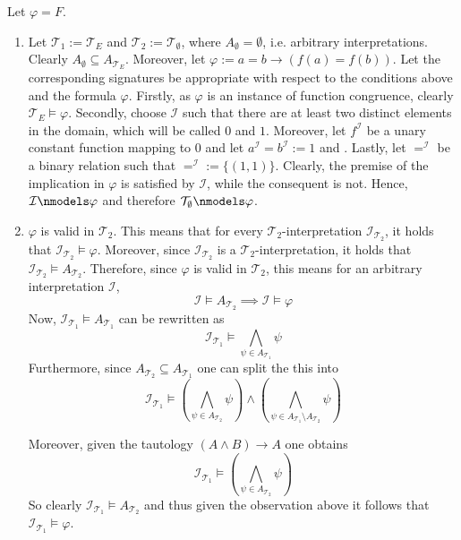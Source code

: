 \documentclass[11pt,a4paper]{article}
\begin{document}
Let $\varphi=F$. 
\begin{enumerate}
\item Let $\mathcal{T}_1 := \mathcal{T}_E$ and $\mathcal{T}_2:= \mathcal{T}_{\emptyset}$, where $A_{\emptyset}= \emptyset$, i.e. arbitrary interpretations. Clearly $A_{\emptyset}\subseteq A_{\mathcal{T}_E}$. Moreover, let $\varphi:= a=b \to (f(a)=f(b))$. Let the corresponding signatures be appropriate with respect to the conditions above and the formula $\varphi$.
Firstly, as $\varphi$ is an instance of function congruence, clearly $\mathcal{T}_E \models \varphi$. Secondly, choose $\mathcal{I}$ such that there are at least two distinct elements in the domain, which will be called $0$ and $1$. Moreover, let $f^{\mathcal{I}}$ be a unary constant function mapping to $0$ and let $a^{\mathcal{I}}=b^{\mathcal{I}}:=1$ and . Lastly, let $=^\mathcal{I}$ be a binary relation such that $=^{\mathcal{I}}:=\{(1,1)\}$. Clearly, the premise of the implication in $\varphi$ is satisfied by $\mathcal{I}$, while the consequent is not. Hence, $\mathcal{I} \nmodels \varphi$ and therefore $\mathcal{T}_{\emptyset} \nmodels \varphi$.


\item $\varphi$ is valid in $\mathcal{T}_2$. This means that for every $\mathcal{T}_2$-interpretation $\mathcal{I}_{\mathcal{T}_2}$, it holds that $\mathcal{I}_{\mathcal{T}_2} \models \varphi$. Moreover, since $\mathcal{I}_{\mathcal{T}_2}$ is a $\mathcal{T}_2$-interpretation, it holds that $\mathcal{I}_{\mathcal{T}_2} \models A_{\mathcal{T}_2}$.
Therefore, since $\varphi$ is valid in $\mathcal{T}_2$, this means for an arbitrary interpretation $\mathcal{I}$, 
\begin{equation*} 
\mathcal{I} \models A_{\mathcal{T}_2} \implies \mathcal{I} \models \varphi
\end{equation*}
Now, $\mathcal{I}_{\mathcal{T}_1} \models A_{\mathcal{T}_1}$ can be rewritten as
\begin{equation*}
\mathcal{I}_{\mathcal{T}_1} \models \bigwedge_{\psi \in A_{\mathcal{T}_1}} \psi
\end{equation*}
Furthermore, since $A_{\mathcal{T}_2} \subseteq A_{\mathcal{T}_1}$ one can split the this into
\begin{equation*}
\mathcal{I}_{\mathcal{T}_1} \models \left(\bigwedge_{\psi \in A_{\mathcal{T}_2}} \psi \right) \land \left( \bigwedge_{\psi \in A_{\mathcal{T}_1} \setminus A_{\mathcal{T}_2}} \psi  \right)
\end{equation*}

Moreover, given the tautology $(A \land B )\to A $ one obtains
\begin{equation*}
\mathcal{I}_{\mathcal{T}_1} \models \left(\bigwedge_{\psi \in A_{\mathcal{T}_2}} \psi \right) 
\end{equation*}
So clearly $\mathcal{I}_{\mathcal{T}_1} \models A_{\mathcal{T}_2}$ and thus given the observation above it follows that $\mathcal{I}_{\mathcal{T}_1} \models \varphi$.


\end{enumerate}
\end{document}
